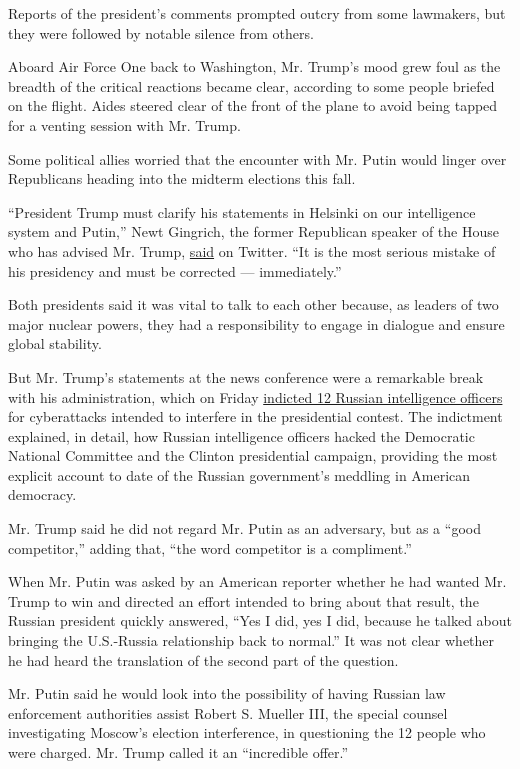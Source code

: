 Reports of the president's comments prompted outcry from some lawmakers,
but they were followed by notable silence from others.

Aboard Air Force One back to Washington, Mr. Trump's mood grew foul as
the breadth of the critical reactions became clear, according to some
people briefed on the flight. Aides steered clear of the front of the
plane to avoid being tapped for a venting session with Mr. Trump.

Some political allies worried that the encounter with Mr. Putin would
linger over Republicans heading into the midterm elections this fall.

``President Trump must clarify his statements in Helsinki on our
intelligence system and Putin,'' Newt Gingrich, the former Republican
speaker of the House who has advised Mr. Trump,
\href{https://twitter.com/newtgingrich/status/1018967261418344450}{said}
on Twitter. ``It is the most serious mistake of his presidency and must
be corrected --- immediately.''

Both presidents said it was vital to talk to each other because, as
leaders of two major nuclear powers, they had a responsibility to engage
in dialogue and ensure global stability.

But Mr. Trump's statements at the news conference were a remarkable
break with his administration, which on Friday
\href{https://www.nytimes.com/2018/07/13/us/politics/mueller-indictment-russian-intelligence-hacking.html}{indicted
12 Russian intelligence officers} for cyberattacks intended to interfere
in the presidential contest. The indictment explained, in detail, how
Russian intelligence officers hacked the Democratic National Committee
and the Clinton presidential campaign, providing the most explicit
account to date of the Russian government's meddling in American
democracy.

Mr. Trump said he did not regard Mr. Putin as an adversary, but as a
``good competitor,'' adding that, ``the word competitor is a
compliment.''

When Mr. Putin was asked by an American reporter whether he had wanted
Mr. Trump to win and directed an effort intended to bring about that
result, the Russian president quickly answered, ``Yes I did, yes I did,
because he talked about bringing the U.S.-Russia relationship back to
normal.'' It was not clear whether he had heard the translation of the
second part of the question.

Mr. Putin said he would look into the possibility of having Russian law
enforcement authorities assist Robert S. Mueller III, the special
counsel investigating Moscow's election interference, in questioning the
12 people who were charged. Mr. Trump called it an ``incredible offer.''

